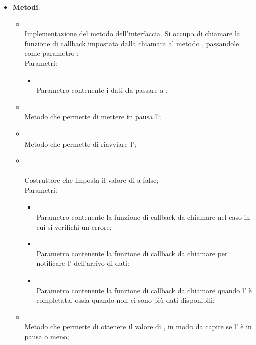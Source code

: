 \begin{itemize}
\begin{itemize}
	\end{itemize}
	\item \textbf{Metodi}:
	\begin{itemize}
		\item[]  \\		Implementazione del metodo dell'interfaccia. Si occupa di chiamare la funzione di callback impostata dalla chiamata al metodo , passandole come parametro ;\\
		Parametri:
		\begin{itemize}
			\item {} \\
			Parametro contenente i dati da passare a ;
		\end{itemize}
		\item[]  \\		Metodo che permette di mettere in pausa l';\\
		\item[]  \\		Metodo che permette di riavviare l';\\
		\item[] \\ \\		Costruttore che imposta il valore di  a false;\\
		Parametri:
		\begin{itemize}
			\item {} \\
			Parametro contenente la funzione di callback da chiamare nel caso in cui si verifichi un errore;
			\item {} \\
			Parametro contenente la funzione di callback da chiamare per notificare l' dell'arrivo di dati;
			\item {} \\
			Parametro contenente la funzione di callback da chiamare quando l' è completata, ossia quando non ci sono più dati disponibili;
		\end{itemize}
		\item[]  \\		Metodo che permette di ottenere il valore di , in modo da capire se l' è in pausa o meno;\\

\end{itemize}
\end{itemize}
